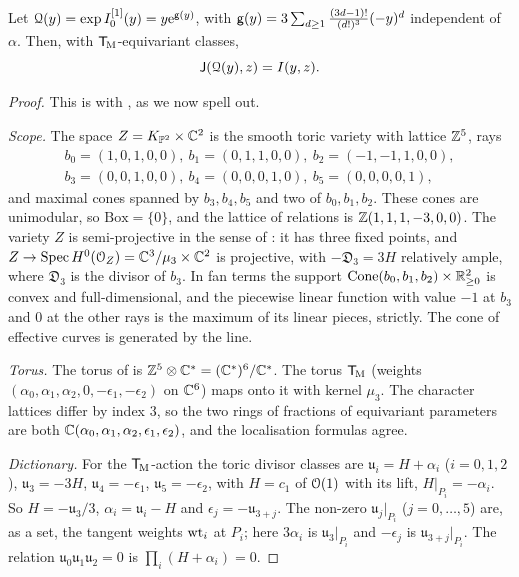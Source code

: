 \begin{thm}
\label{thm:gen-mirror}
Let $\mathcal{Q}(y)=\exp I_0^{[1]}(y)=y\mathrm{e}^{\mathsf{g}(y)}$, with $\mathsf{g}(y)=3\sum_{d\geq1}\frac{(3d-1)!}{(d!)^3}(-y)^d$ independent of $\alpha$. Then, with $\mathsf{T}_{\!\mathrm{M}}$-equivariant classes,
\[
\mathsf{J}(\mathcal{Q}(y),z)=I(y,z).
\]
\end{thm}
\begin{proof}
This is \cite[Theorem 31]{CCIT15} with \cite[Definition 28, eq.~(19), eq.~(4), Remark 3]{CCIT15}, as we now spell out.

\emph{Scope.} The space $Z=K_{\mathbb{P}^2}\times\mathbb{C}^2$ is the smooth toric variety with lattice $\mathbb{Z}^5$, rays
\[
\begin{gathered}b_0=(1,0,1,0,0),\ b_1=(0,1,1,0,0),\ b_2=(-1,-1,1,0,0),\\ b_3=(0,0,1,0,0),\ b_4=(0,0,0,1,0),\ b_5=(0,0,0,0,1),\end{gathered}
\]
and maximal cones spanned by $b_3,b_4,b_5$ and two of $b_0,b_1,b_2$. These cones are unimodular, so $\mathrm{Box}=\{0\}$, and the lattice of relations is $\mathbb{Z}(1,1,1,-3,0,0)$. The variety $Z$ is semi-projective in the sense of \cite[Section~3.1]{CCIT15}: it has three fixed points, and $Z\to\operatorname{Spec} H^0(\mathcal{O}_Z)=\mathbb{C}^3/\mu_3\times\mathbb{C}^2$ is projective, with $-\mathfrak{D}_3=3H$ relatively ample, where $\mathfrak{D}_3$ is the divisor of $b_3$. In fan terms the support $\mathrm{Cone}(b_0,b_1,b_2)\times\mathbb{R}_{\geq0}^2$ is convex and full-dimensional, and the piecewise linear function with value $-1$ at $b_3$ and $0$ at the other rays is the maximum of its linear pieces, strictly. The cone of effective curves is generated by the line.

\emph{Torus.} The torus of \cite{CCIT15} is $\mathbb{Z}^5\otimes\mathbb{C}^*=(\mathbb{C}^*)^6/\mathbb{C}^*$. The torus $\mathsf{T}_{\!\mathrm{M}}$ (weights $(\alpha_0,\alpha_1,\alpha_2,0,-\epsilon_1,-\epsilon_2)$ on $\mathbb{C}^6$) maps onto it with kernel $\mu_3$. The character lattices differ by index $3$, so the two rings of fractions of equivariant parameters are both $\mathbb{C}(\alpha_0,\alpha_1,\alpha_2,\epsilon_1,\epsilon_2)$, and the localisation formulas agree.

\emph{Dictionary.} For the $\mathsf{T}_{\!\mathrm{M}}$-action the toric divisor classes are $\mathfrak{u}_i=H+\alpha_i$ ($i=0,1,2$), $\mathfrak{u}_3=-3H$, $\mathfrak{u}_4=-\epsilon_1$, $\mathfrak{u}_5=-\epsilon_2$, with $H=c_1$ of $\mathcal{O}(1)$ with its lift, $H|_{P_i}=-\alpha_i$. So $H=-\mathfrak{u}_3/3$, $\alpha_i=\mathfrak{u}_i-H$ and $\epsilon_j=-\mathfrak{u}_{3+j}$. The non-zero $\mathfrak{u}_j|_{P_i}$ ($j=0,\dots,5$) are, as a set, the tangent weights $\mathrm{wt}_i$ at $P_i$; here $3\alpha_i$ is $\mathfrak{u}_3|_{P_i}$ and $-\epsilon_j$ is $\mathfrak{u}_{3+j}|_{P_i}$. The relation $\mathfrak{u}_0\mathfrak{u}_1\mathfrak{u}_2=0$ is $\prod_i(H+\alpha_i)=0$.


\end{proof}
